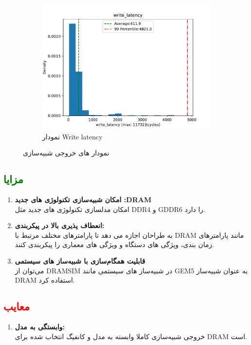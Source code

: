 \documentclass[12pt]{exam}
\begin{document}
\begin{questions}
\begin{figure}
\begin{subfigure}[b]{0.4\textwidth}
		\includegraphics[width=1\textwidth]{images/img15}
		\caption{نمودار Write latency}
		\label{نمودار Write latency}
	\end{subfigure}
	\caption{نمودار های خروجی شبیه‌سازی}
	\label{نمودار های خروجی شبیه‌سازی}
\end{figure}




\subsection{\textcolor{green}{مزایا}}
\begin{enumerate}
	\item \textbf{امکان شبیه‌سازی تکنولوژی های جدید :DRAM }\\
	امکان مدلسازی تکنولوژی های جدید مثل DDR4 و GDDR6 را دارد.
	
	\item \textbf{انعطاف پذیری بالا در پیکربندی: }\\
به طراحان اجازه می دهد تا پارامترهای مختلف مرتبط با DRAM مانند پارامترهای زمان بندی، ویژگی های دستگاه و ویژگی های معماری را پیکربندی کنند.

	
	\item \textbf{قابلیت همگام‌سازی با شبیه‌ساز های سیستمی}\\
	می‌توان از DRAMSIM در شبیه‌ساز های سیستمی مانند GEM5 به عنوان شبیه‌ساز DRAM استفاده کرد.
\end{enumerate}


\subsection{\textcolor{red}{معایب}}
\begin{enumerate}
	\item \textbf{وابستگی به مدل: }\\
	خروجی شبیه‌سازی کاملا وابسته به مدل و کانفیگ انتخاب شده برای DRAM است.
	

\end{enumerate}
\end{questions}
\end{document}
